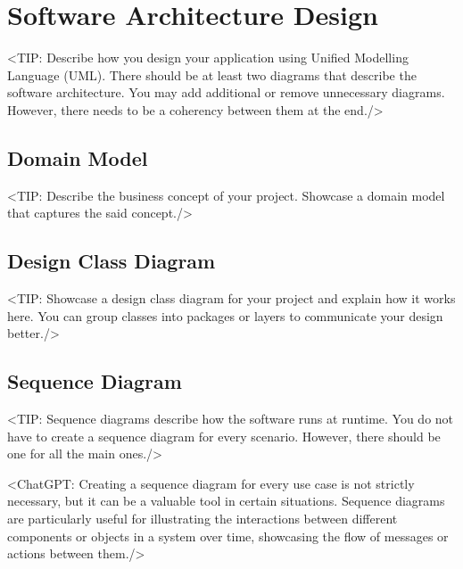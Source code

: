 \chapter{Software Architecture Design}
\label{chap:software-architecture-design}
<TIP: Describe how you design your application using Unified Modelling
Language (UML). There should be at least two diagrams that describe the
software architecture. You may add additional or remove unnecessary diagrams.
However, there needs to be a coherency between them at the end./>

\section{Domain Model}
\label{section:domain-model}
<TIP: Describe the business concept of your project. Showcase a
domain model that captures the said concept./>

\section{Design Class Diagram}
\label{section:design-class-diagram}
<TIP: Showcase a design class diagram for your project and explain
how it works here. You can group classes into packages or layers to communicate your
design better./>

\section{Sequence Diagram}
\label{section:sequence-diagram}
<TIP: Sequence diagrams describe how the software runs at runtime.
You do not have to create a sequence diagram for every scenario. However,
there should be one for all the main ones./>

<ChatGPT: Creating a sequence diagram for every use case is not
strictly necessary, but it can be a valuable tool in certain situations. Sequence
diagrams are particularly useful for illustrating the interactions between different
components or objects in a system over time, showcasing the flow of messages
or actions between them./>


